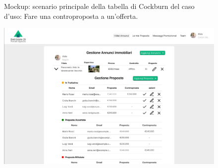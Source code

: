 \begin{figure}[H]
	\caption{Mockup: scenario principale della tabella di Cockburn del caso d'uso: Fare una controproposta a un'offerta.}
	\label{fig:tikz_flow}
\end{figure}

\newpage

\begin{figure}[H]
	\centering
	\includegraphics[width=0.7\linewidth]{"Immagini/Mockup/controproposte/scenario principale/visualizzazioneControproposta"}
	\caption[Visualizzazione della controproposta]{}
	\label{fig:visualizzazionecontroproposta}
\end{figure}



\newpage



\newpage

